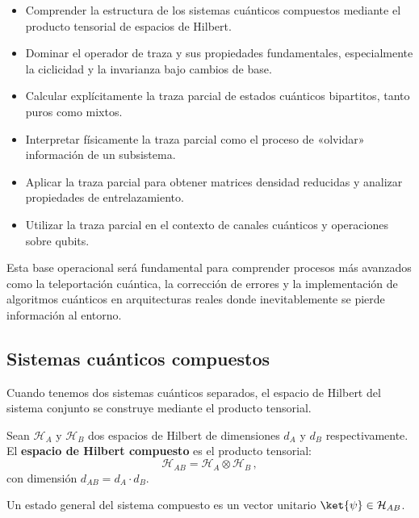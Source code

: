 \begin{itemize}
  \item Comprender la estructura de los sistemas cuánticos compuestos mediante el producto tensorial de espacios de Hilbert.
  \item Dominar el operador de traza y sus propiedades fundamentales, especialmente la ciclicidad y la invarianza bajo cambios de base.
  \item Calcular explícitamente la traza parcial de estados cuánticos bipartitos, tanto puros como mixtos.
  \item Interpretar físicamente la traza parcial como el proceso de «olvidar» información de un subsistema.
  \item Aplicar la traza parcial para obtener matrices densidad reducidas y analizar propiedades de entrelazamiento.
  \item Utilizar la traza parcial en el contexto de canales cuánticos y operaciones sobre qubits.
\end{itemize}

Esta base operacional será fundamental para comprender procesos más avanzados como la teleportación cuántica, la corrección de errores y la implementación de algoritmos cuánticos en arquitecturas reales donde inevitablemente se pierde información al entorno.

\subsection{Sistemas cuánticos compuestos}

Cuando tenemos dos sistemas cuánticos separados, el espacio de Hilbert del sistema conjunto se construye mediante el producto tensorial.

\begin{defi}
  Sean $\mathcal{H}_A$ y $\mathcal{H}_B$ dos espacios de Hilbert de dimensiones $d_A$ y $d_B$ respectivamente. El \textbf{espacio de Hilbert compuesto} es el producto tensorial:
  \[
    \mathcal{H}_{AB} = \mathcal{H}_A \otimes \mathcal{H}_B\,,
  \]
  con dimensión $d_{AB} = d_A \cdot d_B$.

  Un estado general del sistema compuesto es un vector unitario $\ket{\psi} \in \mathcal{H}_{AB}$.
\end{defi}

